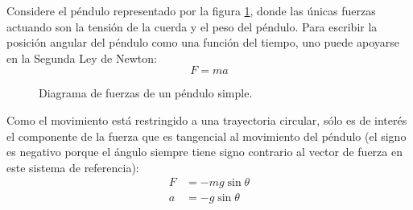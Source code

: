 \begin{ex}

    Considere el péndulo representado por la figura \ref{fig:pendulo}, donde
    las únicas fuerzas actuando son la tensión de la cuerda y el peso del
    péndulo. Para escribir la posición angular del péndulo como una función del
    tiempo, uno puede apoyarse en la Segunda Ley de Newton:
    \[
        F = ma
    \]

    \begin{figure}
        \centering
        \caption{Diagrama de fuerzas de un péndulo simple.}
        \label{fig:pendulo}
    \end{figure}

    Como el movimiento está restringido a una trayectoria circular, sólo es de
    interés el componente de la fuerza que es tangencial al movimiento del
    péndulo (el signo es negativo porque el ángulo siempre tiene signo
    contrario al vector de fuerza en este sistema de referencia):
    \begin{align*}
        F &= -mg \sin \theta\\
        a &= -g \sin \theta\\
    \end{align*}


\end{ex}

